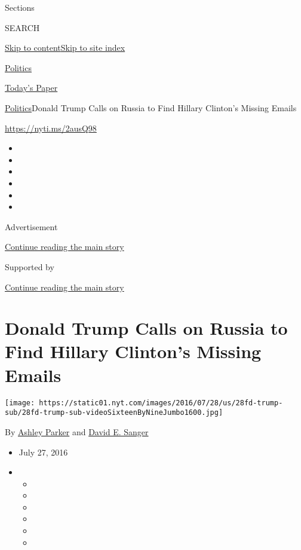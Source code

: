 Sections

SEARCH

\protect\hyperlink{site-content}{Skip to
content}\protect\hyperlink{site-index}{Skip to site index}

\href{https://www.nytimes.com/section/politics}{Politics}

\href{https://myaccount.nytimes.com/auth/login?response_type=cookie\&client_id=vi}{}

\href{https://www.nytimes.com/section/todayspaper}{Today's Paper}

\href{/section/politics}{Politics}\textbar{}Donald Trump Calls on Russia
to Find Hillary Clinton's Missing Emails

\url{https://nyti.ms/2ausQ98}

\begin{itemize}
\item
\item
\item
\item
\item
\item
\end{itemize}

Advertisement

\protect\hyperlink{after-top}{Continue reading the main story}

Supported by

\protect\hyperlink{after-sponsor}{Continue reading the main story}

\hypertarget{donald-trump-calls-on-russia-to-find-hillary-clintons-missing-emails}{%
\section{Donald Trump Calls on Russia to Find Hillary Clinton's Missing
Emails}\label{donald-trump-calls-on-russia-to-find-hillary-clintons-missing-emails}}

\texttt{[image: https://static01.nyt.com/images/2016/07/28/us/28fd-trump-sub/28fd-trump-sub-videoSixteenByNineJumbo1600.jpg]}

By \href{http://www.nytimes.com/by/ashley-parker}{Ashley Parker} and
\href{http://www.nytimes.com/by/david-e-sanger}{David E. Sanger}

\begin{itemize}
\item
  July 27, 2016
\item
  \begin{itemize}
  \item
  \item
  \item
  \item
  \item
  \item
  \end{itemize}
\end{itemize}

